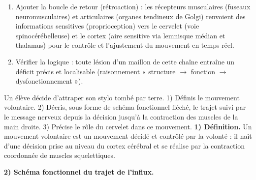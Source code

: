 \documentclass[11pt]{article}
\newcommand{\cle}[1]{{\popxbold\color{popdark}#1}}
\begin{document}
\begin{methode}
\begin{enumerate}
\item \cle{Ajouter la boucle de retour (rétroaction)} : les récepteurs musculaires (fuseaux neuromusculaires) et articulaires (organes tendineux de Golgi) renvoient des informations sensitives (proprioception) vers le cervelet (voie spinocérébelleuse) et le cortex (aire sensitive via lemnisque médian et thalamus) pour le contrôle et l'ajustement du mouvement en temps réel.
\item \cle{Vérifier la logique} : toute lésion d'un maillon de cette chaîne entraîne un déficit précis et localisable (raisonnement « structure $\rightarrow$ fonction $\rightarrow$ dysfonctionnement »).
\end{enumerate}
\end{methode}

\begin{exoresolu}
Un élève décide d'attraper son stylo tombé par terre. 1) Définis le mouvement volontaire. 2) Décris, sous forme de schéma fonctionnel fléché, le trajet suivi par le message nerveux depuis la décision jusqu'à la contraction des muscles de la main droite. 3) Précise le rôle du cervelet dans ce mouvement.
\tcblower
\textbf{1) Définition.} Un \cle{mouvement volontaire} est un mouvement décidé et contrôlé par la volonté : il naît d'une décision prise au niveau du cortex cérébral et se réalise par la contraction coordonnée de muscles squelettiques.

\textbf{2) Schéma fonctionnel du trajet de l'influx.}


\end{exoresolu}
\end{document}
